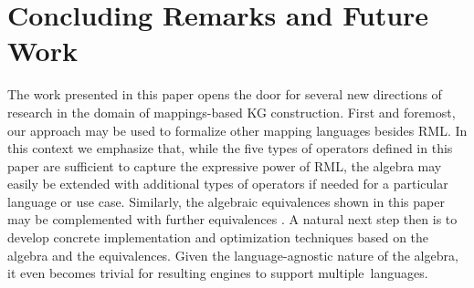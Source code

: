 \vspace{-3mm} %

\section{Concluding Remarks and Future Work}%
\label{sec:conclude_remark_fw}

\vspace{-2mm} %

The work presented in this paper opens the door for several new directions of research in the domain of
	mappings-based KG construction.
First and foremost, our approach may be
	used
to formalize
other mapping languages besides RML. In this context we emphasize that, while the five types of
operators
	defined
in this paper are sufficient to capture the expressive power of RML,
the algebra may easily be extended with additional types of operators if needed for a particular language or
	use case.
Similarly, the
algebraic equivalences
	shown in this paper
may be complemented with further equivalences%
. A natural next step then is to
	develop
concrete implementation and optimization techniques based on the algebra and the equivalences. Given the language-agnostic nature of the algebra,
	it even becomes trivial for resulting engines to support multiple~languages.

